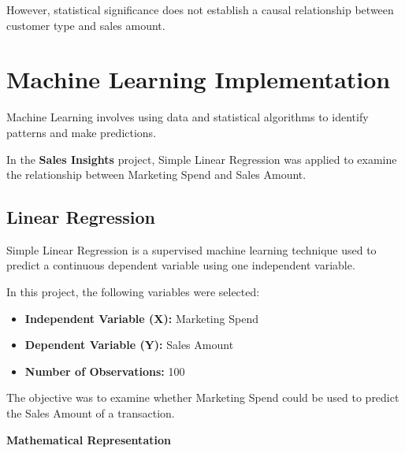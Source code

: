 \documentclass[12pt,a4paper]{report}
\begin{document}
However, statistical significance
does not establish a causal
relationship between customer
type and sales amount.

\endgroup




\chapter{Machine Learning Implementation}

\begingroup
\fontsize{14}{21}\selectfont

Machine Learning involves using data
and statistical algorithms to identify
patterns and make predictions.

In the \textbf{Sales Insights} project,
Simple Linear Regression was applied
to examine the relationship between
Marketing Spend and Sales Amount.


\section{Linear Regression}

Simple Linear Regression is a supervised
machine learning technique used to
predict a continuous dependent variable
using one independent variable.

In this project, the following
variables were selected:

\begin{itemize}

    \item \textbf{Independent Variable (X):}
    Marketing Spend

    \item \textbf{Dependent Variable (Y):}
    Sales Amount

    \item \textbf{Number of Observations:}
    100

\end{itemize}

The objective was to examine whether
Marketing Spend could be used to
predict the Sales Amount of a transaction.

\medskip

\noindent\textbf{Mathematical Representation}
\end{document}
